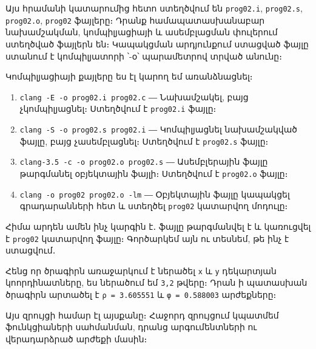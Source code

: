 \begin{Shaded}
\begin{Highlighting}[]
\NormalTok{$ }
\end{Highlighting}
\end{Shaded}

Այս հրամանի կատարումից հետո ստեղծվում են \texttt{prog02.i},
\texttt{prog02.s}, \texttt{prog02.o}, \texttt{prog02} ֆայլերը։ Դրանք
համապատասխանաբար նախամշակման, կոմպիլյացիայի և ասեմբլացման փուլերում
ստեղծված ֆայլերն են։ Կապակցման արդյունքում ստացված ֆայլը ստանում է
կոմպիլյատորի ՝-օ՝ պարամետրով տրված անունը։

Կոմպիլյացիայի քայլերը ես էլ կարող եմ առանձնացնել։

\begin{enumerate}
\def\labelenumi{\arabic{enumi}.}
\tightlist
\item
  \texttt{clang\ -E\ -o\ prog02.i\ prog02.c} ― Նախամշակել, բայց
  չկոմպիլյացնել։ Ստեղծվում է \texttt{prog02.i} ֆայլը։
\item
  \texttt{clang\ -S\ -o\ prog02.s\ prog02.i} ― Կոմպիլյացնել նախամշակված
  ֆայլը, բայց չասեմբլացնել։ Ստեղծվում է \texttt{prog02.s} ֆայլը։
\item
  \texttt{clang-3.5\ -c\ -o\ prog02.o\ prog02.s} ― Ասեմբլերային ֆայլը
  թարգմանել օբյեկտային ֆայլի։ Ստեղծվում է \texttt{prog02.o} ֆայլը։
\item
  \texttt{clang\ -o\ prog02\ prog02.o\ -lm} ― Օբյեկտային ֆայլը կապակցել
  գրադարանների հետ և ստեղծել \texttt{prog02} կատարվող մոդուլը։
\end{enumerate}

Հիմա արդեն ամեն ինչ կարգին է․ ֆայլը թարգմանվել է և կառուցվել է
\texttt{prog02} կատարվող ֆայլը։ Գործարկեմ այն ու տեսնեմ, թե ինչ է
ստացվում․

\begin{Shaded}
\begin{Highlighting}[]
\NormalTok{$ }
\end{Highlighting}
\end{Shaded}

Հենց որ ծրագիրն առաջարկում է ներածել \texttt{x} և \texttt{y} դեկարտյան
կոորդինատները, ես ներածում եմ \texttt{3,2} թվերը։ Դրան ի պատասխան
ծրագիրն արտածել է \texttt{ρ\ =\ 3.605551} և \texttt{φ\ =\ 0.588003}
արժեքները։

Այս զրույցի համար էլ այսքանը։ Հաջորդ զրույցում կպատմեմ ֆունկցիաների
սահմանման, դրանց արգումենտների ու վերադարձրած արժեքի մասին։
